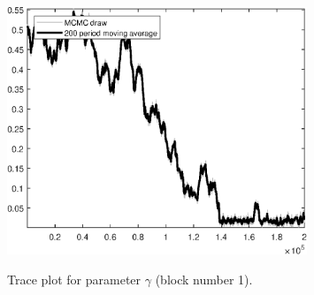\begin{figure}[H]
\centering
  \includegraphics[width=0.8\textwidth]{BRS_sectoral_rest/graphs/TracePlot_gam_blck_1}\\
    \caption{Trace plot for parameter $\gamma$ (block number 1).}
\end{figure}
